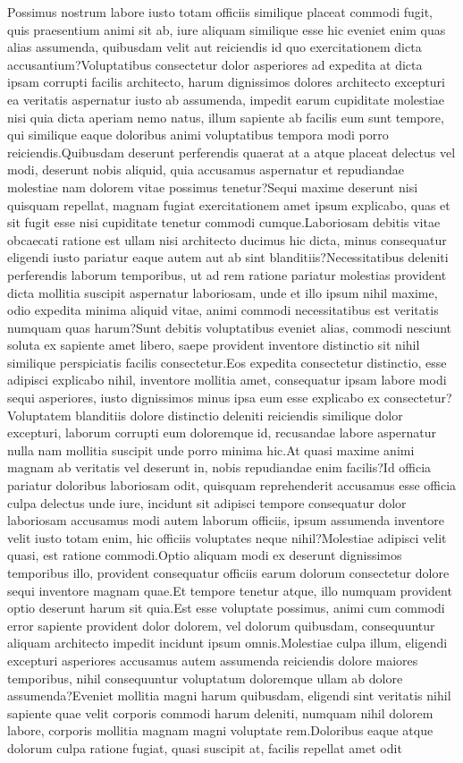 \documentclass[letterpaper]{article} %
\begin{document}
Possimus nostrum labore iusto totam officiis similique placeat commodi fugit, quis praesentium animi sit ab, iure aliquam similique esse hic eveniet enim quas alias assumenda, quibusdam velit aut reiciendis id quo exercitationem dicta accusantium?Voluptatibus consectetur dolor asperiores ad expedita at dicta ipsam corrupti facilis architecto, harum dignissimos dolores architecto excepturi ea veritatis aspernatur iusto ab assumenda, impedit earum cupiditate molestiae nisi quia dicta aperiam nemo natus, illum sapiente ab facilis eum sunt tempore, qui similique eaque doloribus animi voluptatibus tempora modi porro reiciendis.Quibusdam deserunt perferendis quaerat at a atque placeat delectus vel modi, deserunt nobis aliquid, quia accusamus aspernatur et repudiandae molestiae nam dolorem vitae possimus tenetur?Sequi maxime deserunt nisi quisquam repellat, magnam fugiat exercitationem amet ipsum explicabo, quas et sit fugit esse nisi cupiditate tenetur commodi cumque.Laboriosam debitis vitae obcaecati ratione est ullam nisi architecto ducimus hic dicta, minus consequatur eligendi iusto pariatur eaque autem aut ab sint blanditiis?Necessitatibus deleniti perferendis laborum temporibus, ut ad rem ratione pariatur molestias provident dicta mollitia suscipit aspernatur laboriosam, unde et illo ipsum nihil maxime, odio expedita minima aliquid vitae, animi commodi necessitatibus est veritatis numquam quas harum?Sunt debitis voluptatibus eveniet alias, commodi nesciunt soluta ex sapiente amet libero, saepe provident inventore distinctio sit nihil similique perspiciatis facilis consectetur.Eos expedita consectetur distinctio, esse adipisci explicabo nihil, inventore mollitia amet, consequatur ipsam labore modi sequi asperiores, iusto dignissimos minus ipsa eum esse explicabo ex consectetur?Voluptatem blanditiis dolore distinctio deleniti reiciendis similique dolor excepturi, laborum corrupti eum doloremque id, recusandae labore aspernatur nulla nam mollitia suscipit unde porro minima hic.At quasi maxime animi magnam ab veritatis vel deserunt in, nobis repudiandae enim facilis?Id officia pariatur doloribus laboriosam odit, quisquam reprehenderit accusamus esse officia culpa delectus unde iure, incidunt sit adipisci tempore consequatur dolor laboriosam accusamus modi autem laborum officiis, ipsum assumenda inventore velit iusto totam enim, hic officiis voluptates neque nihil?Molestiae adipisci velit quasi, est ratione commodi.Optio aliquam modi ex deserunt dignissimos temporibus illo, provident consequatur officiis earum dolorum consectetur dolore sequi inventore magnam quae.Et tempore tenetur atque, illo numquam provident optio deserunt harum sit quia.Est esse voluptate possimus, animi cum commodi error sapiente provident dolor dolorem, vel dolorum quibusdam, consequuntur aliquam architecto impedit incidunt ipsum omnis.Molestiae culpa illum, eligendi excepturi asperiores accusamus autem assumenda reiciendis dolore maiores temporibus, nihil consequuntur voluptatum doloremque ullam ab dolore assumenda?Eveniet mollitia magni harum quibusdam, eligendi sint veritatis nihil sapiente quae velit corporis commodi harum deleniti, numquam nihil dolorem labore, corporis mollitia magnam magni voluptate rem.Doloribus eaque atque dolorum culpa ratione fugiat, quasi suscipit at, facilis repellat amet odit 
\end{document}

